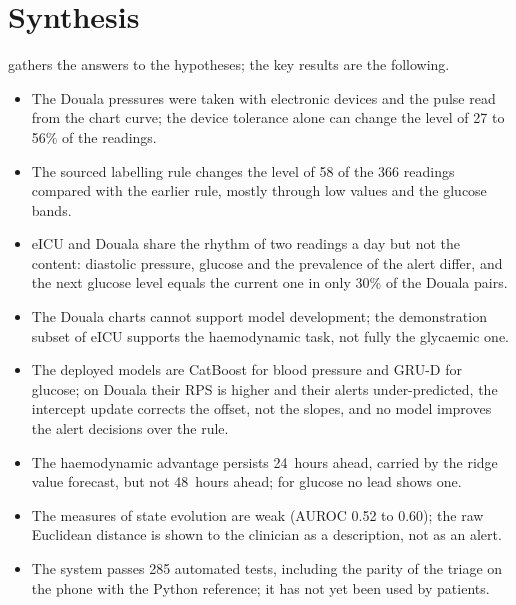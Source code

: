 \section{Synthesis}\label{sec:results-synthesis}

 gathers the answers to the hypotheses; the key results are the following.
\begin{itemize}
  \item The Douala pressures were taken with electronic devices and the pulse read from the chart curve; the device tolerance alone can change the level of 27 to 56\% of the readings.
  \item The sourced labelling rule changes the level of 58 of the 366 readings compared with the earlier rule, mostly through low values and the glucose bands.
  \item eICU and Douala share the rhythm of two readings a day but not the content: diastolic pressure, glucose and the prevalence of the alert differ, and the next glucose level equals the current one in only 30\% of the Douala pairs.
  \item The Douala charts cannot support model development; the demonstration subset of eICU supports the haemodynamic task, not fully the glycaemic one.
  \item The deployed models are CatBoost for blood pressure and GRU-D for glucose; on Douala their RPS is higher and their alerts under-predicted, the intercept update corrects the offset, not the slopes, and no model improves the alert decisions over the rule.
  \item The haemodynamic advantage persists 24~hours ahead, carried by the ridge value forecast, but not 48~hours ahead; for glucose no lead shows one.
  \item The measures of state evolution are weak (AUROC 0.52 to 0.60); the raw Euclidean distance is shown to the clinician as a description, not as an alert.
  \item The system passes 285 automated tests, including the parity of the triage on the phone with the Python reference; it has not yet been used by patients.
\end{itemize}

